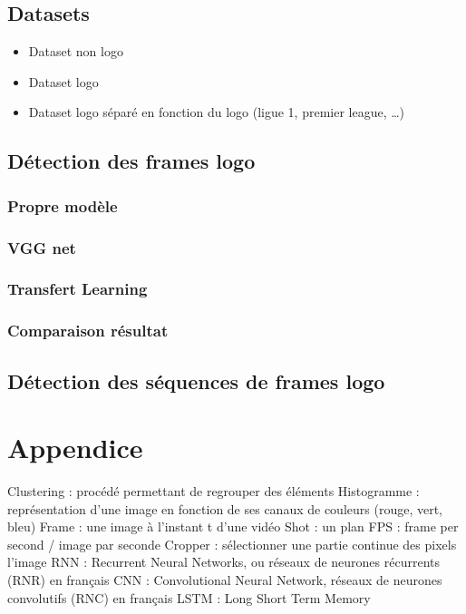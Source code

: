 \documentclass[11pt]{article}
\begin{document}
\subsection{Datasets}
\label{sec:org889af4e}
\begin{itemize}
\item Dataset non logo
\item Dataset logo
\item Dataset logo séparé en fonction du logo (ligue 1, premier league, \ldots{})
\end{itemize}


\subsection{Détection des frames logo}
\label{sec:orgbc47042}
\subsubsection{Propre modèle}
\label{sec:org34b0835}
\subsubsection{VGG net}
\label{sec:orga1c711f}
\subsubsection{Transfert Learning}
\label{sec:org20ecd3d}
\subsubsection{Comparaison résultat}
\label{sec:orga2d0f90}

\subsection{Détection des séquences de frames logo}
\label{sec:orgd5217e2}

\section{Appendice}
\label{sec:org8961bc3}
Clustering : procédé permettant de regrouper des éléments
Histogramme : représentation d'une image en fonction de ses canaux de couleurs (rouge, vert, bleu)
Frame : une image à l'instant t d'une vidéo
Shot : un plan
FPS : frame per second / image par seconde
Cropper : sélectionner une partie continue des pixels l'image
RNN : Recurrent Neural Networks, ou réseaux de neurones récurrents (RNR) en français
CNN : Convolutional Neural Network, réseaux de neurones convolutifs (RNC) en français
LSTM : Long Short Term Memory
\end{document}
